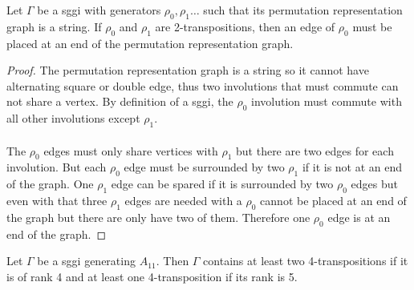 \begin{lemma}\label{rho0atEnd}
  Let $\Gamma$ be a sggi with generators $\rho_0, \rho_1 \dots$ such that its permutation representation graph is a string. If $\rho_0$ and $\rho_1$ are 2-transpositions, then an edge of $\rho_0$ must be placed at an end of the permutation representation graph.
\end{lemma}

\begin{proof}
  The permutation representation graph is a string so it cannot have alternating square or double edge, thus two involutions that must commute can not share a vertex. By definition of a sggi, the $\rho_0$ involution must commute with all other involutions except $\rho_1$.

  \paragraph{}
  The $\rho_0$ edges must only share vertices with $\rho_1$ but there are two edges for each involution. But each $\rho_0$ edge must be surrounded by two $\rho_1$ if it is not at an end of the graph. One $\rho_1$ edge can be spared if it is surrounded by two $\rho_0$ edges but even with that three $\rho_1$ edges are needed with a $\rho_0$ cannot be placed at an end of the graph but there are only have two of them. Therefore one $\rho_0$ edge is at an end of the graph.
\end{proof}

\begin{lemma}
  \label{min-4-trans}
  Let $\Gamma$ be a sggi generating $A_{11}$. Then $\Gamma$ contains at least two 4-transpositions if it is of rank 4 and at least one 4-transposition if its rank is 5.
\end{lemma}

